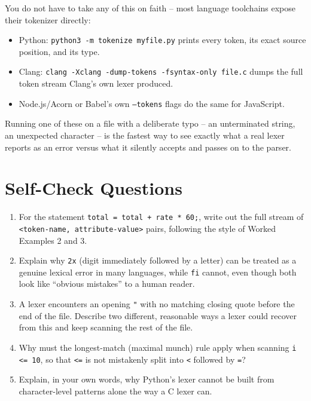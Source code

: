 \documentclass[full-course-notes.tex]{subfiles}
\begin{document}
\begin{enrichment}
You do not have to take any of this on faith -- most language toolchains expose their tokenizer
directly:
\begin{itemize}
  \item Python: \texttt{python3 -m tokenize myfile.py} prints every token, its exact source
  position, and its type.
  \item Clang: \texttt{clang -Xclang -dump-tokens -fsyntax-only file.c} dumps the full token
  stream Clang's own lexer produced.
  \item Node.js/Acorn or Babel's own \texttt{--tokens} flags do the same for JavaScript.
\end{itemize}
Running one of these on a file with a deliberate typo -- an unterminated string, an unexpected
character -- is the fastest way to see exactly what a real lexer reports as an error versus what
it silently accepts and passes on to the parser.
\end{enrichment}

\section{Self-Check Questions}
\label{sec:l3-selfcheck}

\begin{enrichment}
\begin{enumerate}
  \item For the statement \texttt{total = total + rate * 60;}, write out the full stream of
  \texttt{<token-name, attribute-value>} pairs, following the style of Worked Examples 2 and 3.
  \item Explain why \texttt{2x} (digit immediately followed by a letter) can be treated as a
  genuine lexical error in many languages, while \texttt{fi} cannot, even though both look like
  ``obvious mistakes'' to a human reader.
  \item A lexer encounters an opening \texttt{"} with no matching closing quote before the end
  of the file. Describe two different, reasonable ways a lexer could recover from this and keep
  scanning the rest of the file.
  \item Why must the longest-match (maximal munch) rule apply when scanning \texttt{i <= 10}, so
  that \texttt{<=} is not mistakenly split into \texttt{<} followed by \texttt{=}?
  \item Explain, in your own words, why Python's lexer cannot be built from character-level
  patterns alone the way a C lexer can.
\end{enumerate}
\end{enrichment}
\end{document}
